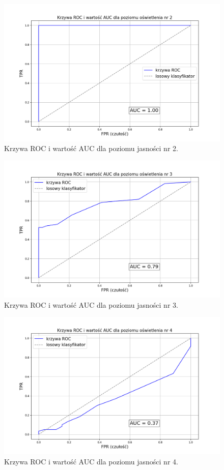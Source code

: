 \begin{figure}[H]
    \centering
    \includegraphics[width=\linewidth]{r_test_dokładności/AUC_charts/2.png}
    \caption{Krzywa ROC i wartość AUC dla poziomu jasności nr 2.}
    \label{fig:ROC-2}
\end{figure}

\begin{figure}[H]
    \centering
    \includegraphics[width=\linewidth]{r_test_dokładności/AUC_charts/3.png}
    \caption{Krzywa ROC i wartość AUC dla poziomu jasności nr 3.}
    \label{fig:ROC-3}
\end{figure}

\begin{figure}[H]
    \centering
    \includegraphics[width=\linewidth]{r_test_dokładności/AUC_charts/4.png}
    \caption{Krzywa ROC i wartość AUC dla poziomu jasności nr 4.}
    \label{fig:ROC-4}
\end{figure}

